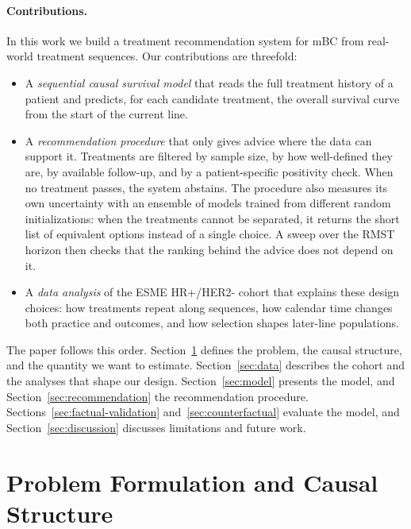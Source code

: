 \documentclass[a4paper,10pt]{article}
\begin{document}
\paragraph{Contributions.}
In this work we build a treatment recommendation system for mBC from real-world treatment sequences. Our contributions are threefold:
\begin{itemize}
    \item[i.] A \emph{sequential causal survival model} that reads the full treatment history of a patient and predicts, for each candidate treatment, the overall survival curve from the start of the current line.
    \item[ii.] A \emph{recommendation procedure} that only gives advice where the data can support it. Treatments are filtered by sample size, by how well-defined they are, by available follow-up, and by a patient-specific positivity check. When no treatment passes, the system abstains. The procedure also measures its own uncertainty with an ensemble of models trained from different random initializations: when the treatments cannot be separated, it returns the short list of equivalent options instead of a single choice. A sweep over the RMST horizon then checks that the ranking behind the advice does not depend on it.
    \item[iii.] A \emph{data analysis} of the ESME HR+/HER2- cohort that explains these design choices: how treatments repeat along sequences, how calendar time changes both practice and outcomes, and how selection shapes later-line populations.
\end{itemize}

The paper follows this order. Section~\ref{sec:formulation} defines the problem, the causal structure, and the quantity we want to estimate. Section~\ref{sec:data} describes the cohort and the analyses that shape our design. Section~\ref{sec:model} presents the model, and Section~\ref{sec:recommendation} the recommendation procedure. Sections~\ref{sec:factual-validation} and~\ref{sec:counterfactual} evaluate the model, and Section~\ref{sec:discussion} discusses limitations and future work.

\section{Problem Formulation and Causal Structure}
\label{sec:formulation}
\end{document}
